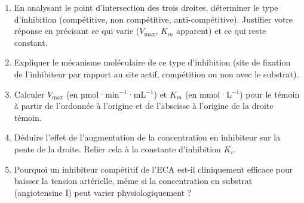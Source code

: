 \documentclass[11pt]{article}
\begin{document}
\begin{exercice}
\begin{enumerate}
    \item En analysant le point d'intersection des trois droites, déterminer le type d'inhibition (compétitive, non compétitive, anti-compétitive). Justifier votre réponse en précisant ce qui varie ($V_{\text{max}}$, $K_m$ apparent) et ce qui reste constant.
    \item Expliquer le mécanisme moléculaire de ce type d'inhibition (site de fixation de l'inhibiteur par rapport au site actif, compétition ou non avec le substrat).
    \item Calculer $V_{\text{max}}$ (en µmol·min$^{-1}$·mL$^{-1}$) et $K_m$ (en mmol·L$^{-1}$) pour le témoin à partir de l'ordonnée à l'origine et de l'abscisse à l'origine de la droite témoin.
    \item Déduire l'effet de l'augmentation de la concentration en inhibiteur sur la pente de la droite. Relier cela à la constante d'inhibition $K_i$.
    \item Pourquoi un inhibiteur compétitif de l'ECA est-il cliniquement efficace pour baisser la tension artérielle, même si la concentration en substrat (angiotensine I) peut varier physiologiquement ?
\end{enumerate}
\end{exercice}
\end{document}
